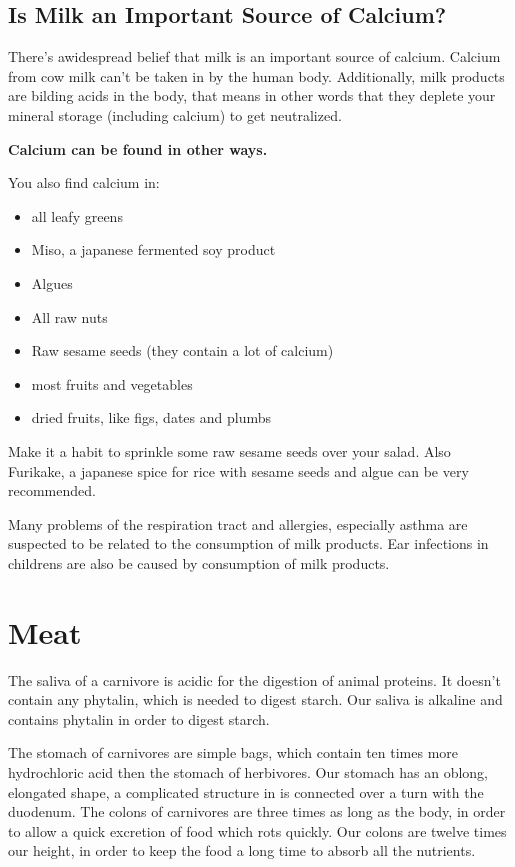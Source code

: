 \documentclass[../main.tex]{subfiles}
\begin{document}
\subsection{Is Milk an Important Source of Calcium?}

There's awidespread belief that milk is an important source of calcium.
Calcium from cow milk can't be taken in by the human body.
Additionally, milk products are bilding acids in the body, that means in other words
that they deplete your mineral storage (including calcium) to get neutralized.

\textbf{Calcium can be found in other ways.}

You also find calcium in:
\begin{itemize}
\item all leafy greens
\item Miso, a japanese fermented soy product
\item Algues
\item All raw nuts
\item Raw sesame seeds (they contain a lot of calcium)
\item most fruits and vegetables
\item dried fruits, like figs, dates and plumbs
\end{itemize}

Make it a habit to sprinkle some raw sesame seeds over your salad.
Also Furikake, a japanese spice for rice with sesame seeds and algue can be very recommended.

Many problems of the respiration tract and allergies,
especially asthma are suspected to be related to
the consumption of milk products.
Ear infections in childrens are also be caused by consumption of milk products.

\section{Meat}

The saliva of a carnivore is acidic for the digestion of animal proteins.
It doesn't contain any phytalin, which is needed to digest starch.
Our saliva is alkaline and contains phytalin in order to digest starch.


The stomach of carnivores are simple bags, which contain ten times more hydrochloric acid then the stomach of herbivores.
Our stomach has an oblong, elongated shape, a complicated structure in is connected over a turn with the duodenum.
The colons of carnivores are three times as long as the body, in order to allow a quick excretion of food which rots quickly.
Our colons are twelve times our height, in order to keep the food a long time to absorb all the nutrients.
\end{document}
